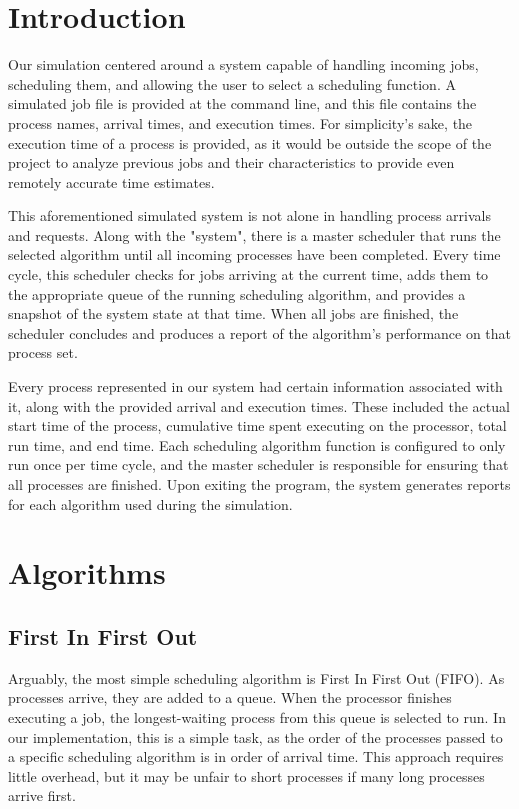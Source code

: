 \documentclass[conference,11pt]{IEEEtran}
\begin{document}
\section{Introduction}
Our simulation centered around a system capable of handling incoming jobs, scheduling them, and allowing the user to select a scheduling function. A simulated job file is provided at the command line, and this file contains the process names, arrival times, and execution times. For simplicity's sake, the execution time of a process is provided, as it would be outside the scope of the project to analyze previous jobs and their characteristics to provide even remotely accurate time estimates.

This aforementioned simulated system is not alone in handling process arrivals and requests. Along with the "system", there is a master scheduler that runs the selected algorithm until all incoming processes have been completed. Every time cycle, this scheduler checks for jobs arriving at the current time, adds them to the appropriate queue of the running scheduling algorithm, and provides a snapshot of the system state at that time. When all jobs are finished, the scheduler concludes and produces a report of the algorithm's performance on that process set.

Every process represented in our system had certain information associated with it, along with the provided arrival and execution times. These included the actual start time of the process, cumulative time spent executing on the processor, total run time, and end time. Each scheduling algorithm function is configured to only run once per time cycle, and the master scheduler is responsible for ensuring that all processes are finished. Upon exiting the program, the system generates reports for each algorithm used during the simulation.

\section{Algorithms}

\subsection{First In First Out}
Arguably, the most simple scheduling algorithm is First In First Out (FIFO). As processes arrive, they are added to a queue. When the processor finishes executing a job, the longest-waiting process from this queue is selected to run. In our implementation, this is a simple task, as the order of the processes passed to a specific scheduling algorithm is in order of arrival time. This approach requires little overhead, but it may be unfair to short processes if many long processes arrive first.
\end{document}
